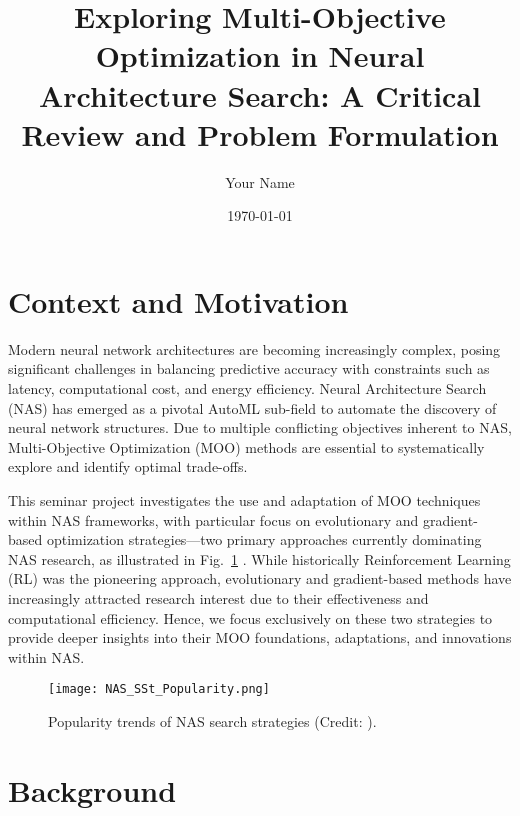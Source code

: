 \documentclass[11pt,a4paper]{article}
\title{Exploring Multi-Objective Optimization in Neural Architecture Search: A Critical Review and Problem Formulation}
\author{Your Name}
\date{\today}
\begin{document}
	
	\maketitle
	
	
	\section{Context and Motivation}
	
	Modern neural network architectures are becoming increasingly complex, posing significant challenges in balancing predictive accuracy with constraints such as latency, computational cost, and energy efficiency. Neural Architecture Search (NAS) has emerged as a pivotal AutoML sub-field to automate the discovery of neural network structures. Due to multiple conflicting objectives inherent to NAS, Multi-Objective Optimization (MOO) methods are essential to systematically explore and identify optimal trade-offs.
	
	This seminar project investigates the use and adaptation of MOO techniques within NAS frameworks, with particular focus on evolutionary and gradient-based optimization strategies—two primary approaches currently dominating NAS research, as illustrated in Fig.~\ref{fig:NAS_SSt_popularity} \cite{salmani2025systematic}. While historically Reinforcement Learning (RL) was the pioneering approach, evolutionary and gradient-based methods have increasingly attracted research interest due to their effectiveness and computational efficiency. Hence, we focus exclusively on these two strategies to provide deeper insights into their MOO foundations, adaptations, and innovations within NAS.
	
	\begin{figure}[htbp]
		\centering
		\texttt{[image: NAS\_SSt\_Popularity.png]}
		\caption{Popularity trends of NAS search strategies (Credit: \cite{salmani2025systematic}).}
		\label{fig:NAS_SSt_popularity}
	\end{figure}
	
	
	\section{Background}
	
\end{document}

